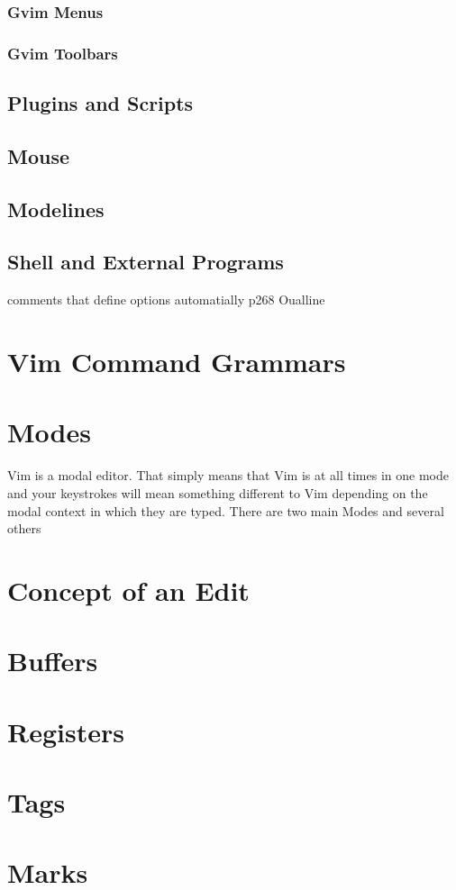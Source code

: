 \documentclass[12pt, oneside]{book}
\begin{document}
    \subsubsection{Gvim Menus}
    \subsubsection{Gvim Toolbars}
  \subsection{Plugins and Scripts}
  \subsection{Mouse}
  \subsection{Modelines}
  \subsection{Shell and External Programs}
comments that define options automatially p268 Oualline
\section{Vim Command Grammars}
\section{Modes}
Vim is a modal editor.  That simply means that Vim is at all times in one mode and your keystrokes will mean something different to Vim depending on the modal context in which they are typed.  There
are two main Modes and several others
\section{Concept of an Edit}
\section{Buffers}
\section{Registers}
\section{Tags}
\section{Marks}
\end{document}
